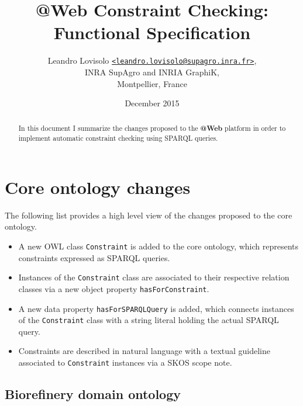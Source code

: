 \documentclass[a4paper, 10pt]{article}
\makeatletter
\newcommand{\atweb}{\textbf{@Web}\xspace}
\newcommand{\code}[1]{\texttt{#1}}
\makeatother
\begin{document}
\title{
  \atweb Constraint Checking: \\
  Functional Specification
}
\author{
  Leandro Lovisolo
  \texttt{\href{mailto:leandro.lovisolo@supagro.inra.fr}
               {<leandro.lovisolo@supagro.inra.fr>}}, \\
  INRA SupAgro and INRIA GraphiK, \\
  Montpellier, France
}
\date{December 2015}

\maketitle

\begin{abstract}
  In this document I summarize the changes proposed to the \atweb platform in
  order to implement automatic constraint checking using SPARQL queries.
\end{abstract}


\section{Core ontology changes}

The following list provides a high level view of the changes proposed to the
core ontology.

\begin{itemize}
  \item A new OWL class \code{Constraint} is added to the core ontology,
  which represents constraints expressed as SPARQL queries.

  \item Instances of the \code{Constraint} class are associated to their
  respective relation classes via a new object property
  \code{hasForConstraint}.

  \item A new data property \code{hasForSPARQLQuery} is added, which connects
  instances of the \code{Constraint} class with a string literal holding the
  actual SPARQL query.

  \item Constraints are described in natural language with a textual guideline
  associated to \code{Constraint} instances via a SKOS scope note.
\end{itemize}

\subsection{Biorefinery domain ontology}
\end{document}
